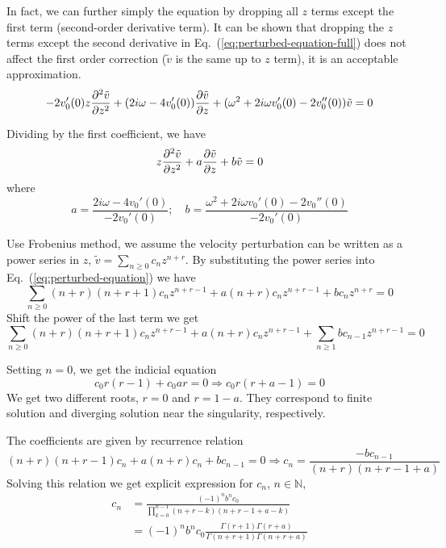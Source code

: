 In fact, we can further simply the equation by dropping all $z$ terms except the first term (second-order derivative term). It can be shown that dropping the $z$ terms except the second derivative in Eq.~(\ref{eq:perturbed-equation-full}) does not affect the first order correction ($\tilde{v}$ is the same up to $z$ term), it is an acceptable approximation.
\begin{equation}
	- 2v_0'(0)z\pdv[2]{\tilde{v}}{z}
	+ (2i\omega - 4v_0'(0))\pdv{\tilde{v}}{z}
	+ (\omega^2 + 2i\omega v_0'(0) - 2v_0''(0))\tilde{v}
	= 0
\end{equation}

Dividing by the first coefficient, we have
\begin{equation}
	z\pdv[2]{\tilde{v}}{z} + a\pdv{\tilde{v}}{z} + b\tilde{v} = 0
	\label{eq:perturbed-equation}
\end{equation}
where
\begin{equation}
	a = \frac{2i\omega - 4v_0'(0)}{-2v_0'(0)}; \quad
	b = \frac{\omega^2 + 2i\omega v_0'(0) - 2v_0''(0)}{-2v_0'(0)}
\end{equation}

Use Frobenius method, we assume the velocity perturbation can be written as a power series in $z$,  $\tilde{v} = \sum_{n\geq 0}c_nz^{n+r}$. By substituting the power series into Eq.~(\ref{eq:perturbed-equation}) we have
\begin{equation}
	\sum_{n \geq 0} (n+r)(n+r+1) c_n z^{n+r-1} + a(n+r)c_nz^{n+r-1} + bc_nz^{n+r} = 0
\end{equation}
Shift the power of the last term we get
\begin{equation}
	\sum_{n \geq 0} (n+r)(n+r+1) c_n z^{n+r-1} + a(n+r)c_nz^{n+r-1} + \sum_{n \geq 1} bc_{n-1}z^{n+r-1} = 0
\end{equation}

Setting $n=0$, we get the indicial equation
\begin{equation}
	c_0 r(r-1) + c_0 ar = 0 \Rightarrow c_0r(r+a-1) = 0
\end{equation}
We get two different roots, $r=0$ and $r=1-a$. They correspond to finite solution and diverging solution near the singularity, respectively.

The coefficients are given by recurrence relation
\begin{equation}
	(n+r)(n+r-1)c_n + a(n+r)c_n + bc_{n-1} = 0
	\Rightarrow
	c_n = \frac{-bc_{n-1}}{(n+r)(n+r-1+a)}
\end{equation}
Solving this relation we get explicit expression for $c_n$, $n\in\mathbb{N}$,
\begin{equation}
	\begin{aligned}
		c_n & = \frac{(-1)^n b^n c_0}{\prod_{k=0}^{n-1} (n+r-k)(n+r-1+a-k)}              \\
		    & = (-1)^n b^n c_0 \frac{\Gamma(r+1)\Gamma(r+a)}{\Gamma(n+r+1)\Gamma(n+r+a)}
	\end{aligned}
	\label{eq:coefficient}
\end{equation}

